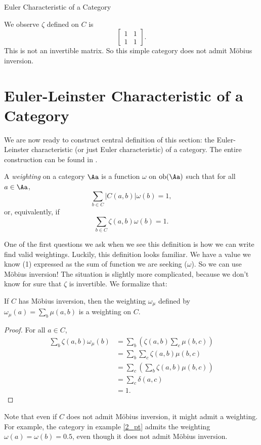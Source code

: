 \documentclass[12pt]{pom_thesis}
\DeclareMathOperator{\obj}{ob}
\begin{document}
\begin{chapter}{Euler Characteristic of a Category}
\begin{examp}
We observe $\zeta$ defined on $C$ is
\[\begin{bmatrix}1 & 1 \\ 1 & 1 \end{bmatrix}.\]
This is not an invertible matrix. So this simple category does not admit M\"obius inversion.
\end{examp} 

\section{Euler-Leinster Characteristic of a Category}
We are now ready to construct central definition of this section: the Euler-Leinster characteristic (or just Euler characteristic) of a category. The entire construction can be found in \cite{Lein1, Lein2, Lein4}. 

\begin{defn}\label{def_weighting}
A \emph{weighting} on a category $\Aa$ is a function $\omega$ on $\obj(\Aa)$ such that for all $a \in \Aa$,
\[
\sum_{b \in C}|C(a,b)|\omega(b) = 1,
\]
or, equivalently, if
\[
\sum_{b \in C}\zeta(a,b)\omega(b) = 1.
\]
\end{defn}

One of the first questions we ask when we see this definition is how we can write find valid weightings. Luckily, this definition looks familiar. We have a value we know (1) expressed as the sum of function we are seeking ($\omega$). So we can use M\"obius inversion! The situation is slightly more complicated, because we don't know for sure that $\zeta$ is invertible. We formalize that:

\begin{lemma}
\label{mobius_is_weighting}
If $C$ has M\"obius inversion, then the weighting $\omega_\mu$ defined by $\omega_\mu(a) = \sum_b \mu(a,b)$ is a weighting on $C$.
\end{lemma}
\begin{proof} For all $a \in C$,
\begin{align*}
\sum_b \zeta(a,b)\omega_\mu(b) &= \sum_b\left( \zeta(a,b)\sum_c \mu(b,c)\right)\\
&=\sum_b\sum_c\zeta(a,b)\mu(b,c)\\
&=\sum_c\left(\sum_b\zeta(a,b)\mu(b,c)\right)\\
&=\sum_c \delta(a,c)\\
&=1.
\end{align*}
\end{proof}

Note that even if $C$ does not admit M\"obius inversion, it might admit a weighting. For example, the category in example \ref{2_pt} admits the weighting $\omega(a) = \omega(b) = 0.5$, even though it does not admit M\"obius inversion.


\end{chapter}
\end{document}
